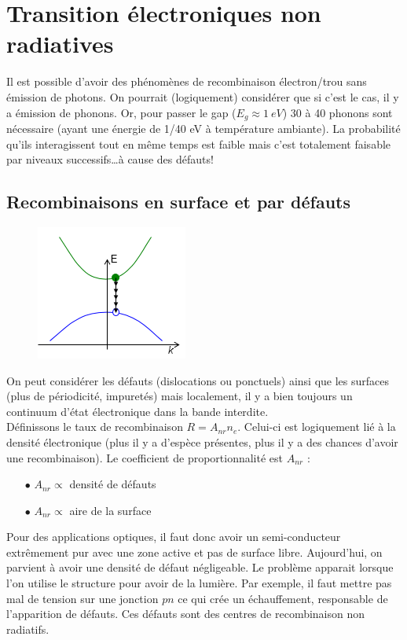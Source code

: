 \newpage
\section{Transition électroniques non radiatives}
Il est possible d'avoir des phénomènes de recombinaison électron/trou sans émission de photons. On 
pourrait (logiquement) considérer que si c'est le cas, il y a émission de phonons. Or, pour passer
le gap ($E_g\approx 1\ eV$) 30 à 40 phonons sont nécessaire (ayant une énergie de 1/40 eV à 
température ambiante). La probabilité qu'ils interagissent tout en même temps est faible mais c'est
totalement faisable par niveaux successifs\dots à cause des défauts!

	\subsection{Recombinaisons en surface et par défauts}
	\begin{figure}
	\vspace{-5mm}
	\includegraphics[scale=0.6]{ch5/image30}
	\end{figure}
	On peut considérer les défauts (dislocations ou ponctuels) ainsi que les surfaces (plus de 
	périodicité, impuretés) mais localement, il y a bien toujours un continuum d'état électronique
	dans la bande interdite. \\
	
	Définissons le taux de recombinaison $R=A_{nr}n_e$. Celui-ci est logiquement lié à la densité
	électronique (plus il y a d'espèce présentes, plus il y a des chances d'avoir une 
	recombinaison). Le coefficient de proportionnalité est $A_{nr}$ :
	\begin{itemize}
	\item[$\bullet$] $A_{nr}\propto $ densité de défauts
	\item[$\bullet$] $A_{nr}\propto $ aire de la surface
	\end{itemize}
	Pour des applications optiques, il faut donc avoir un semi-conducteur extrêmement pur avec 
	une zone active et pas de surface libre. Aujourd'hui, on parvient à avoir une densité de 
	défaut négligeable. Le problème apparait lorsque l'on utilise le structure pour avoir de la
	lumière. Par exemple, il faut mettre pas mal de tension sur une jonction $pn$ ce qui crée 
	un échauffement, responsable de l'apparition de défauts. Ces défauts sont des centres de 
	recombinaison non radiatifs.
	
